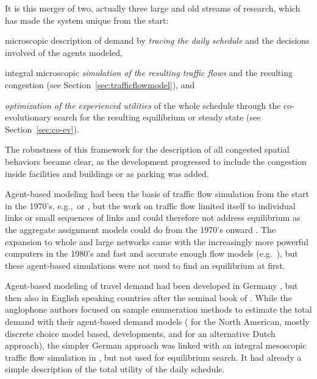 
It is this merger of two, actually three large and old streams of research, which has made the system unique from the start: 
\begin{compactitem}
\item microscopic description of demand by \emph{tracing the daily schedule} and the decisions involved of the agents modeled, 
%
\item integral microscopic \emph{simulation of the resulting traffic flows} and the resulting congestion (see Section~\ref{sec:trafficflowmodel}), and
%
\item  \emph{optimization of the experienced utilities} of the whole schedule through the co-evolutionary search for the resulting equilibrium or steady state (see Section~\ref{sec:co-ev}). 
%
\end{compactitem}
The robustness of this framework for the description of all congested spatial behaviors became clear, as the development progressed to include the congestion inside facilities and buildings or as parking was added. 

Agent-based modeling had been the basis of traffic flow simulation from the start in the 1970’s, e.g.,\,\citet[][]{Wiedemann_PhDThesis_1974} or \citet[][]{Seddon_Simulation_1972}, but the work on traffic flow limited itself to individual links or small sequences of links and could therefore not address equilibrium as the aggregate assignment models could do from the 1970’s onward \citep[see][]{OrtuzarWillumsen_2011}. The expansion to whole and large networks came with the increasingly more powerful computers in the 1980’s and fast and accurate enough flow models (e.g.\ \citet[][]{NagelSchreckenberg_JdPI_1992, Schwerdtfeger_VolmulerHamerslag_1984, Daganzo_TransResPartB_1994}), but these agent-based simulations were not used to find an equilibrium at first. 

Agent-based modeling of travel demand had been developed in Germany \citep[see the references in][]{AxhausenHerz_JTE_1989}, but then also in English speaking countries after the seminal book of \citet[][]{JonesEtAl_1983}.    
%
%
While the anglophone authors focused on sample enumeration methods to estimate the total demand with their agent-based demand models (\citet[see][]{BradleyBowman_TRBTDF_2006} for the North American, mostly discrete choice model based, developments, and \citet[][]{ArentzeTimmermans_2000} for an alternative Dutch approach), the simpler German approach was linked with an integral mesoscopic traffic flow simulation in \citet[][]{Axhausen_PhDThesis_1988}, but not used for equilibrium search. It had already a simple description of the total utility of the daily schedule.

